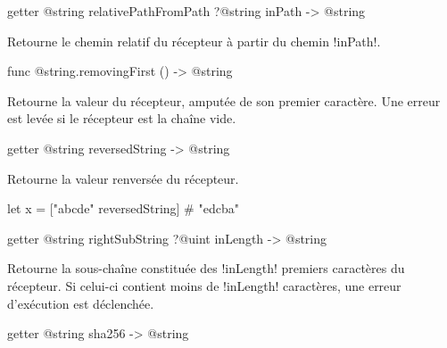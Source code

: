 
\begin{galgas3box}
getter @string relativePathFromPath ?@string inPath -> @string
\end{galgas3box}

Retourne le chemin relatif du récepteur à partir du chemin \ggst!inPath!.










\begin{galgas4box}
func @string.removingFirst () -> @string
\end{galgas4box}

Retourne la valeur du récepteur, amputée de son premier caractère. Une erreur est levée si le récepteur est la chaîne vide.










\begin{galgas3box}
getter @string reversedString -> @string
\end{galgas3box}

Retourne la valeur renversée du récepteur.

\begin{galgas3}
let x = ["abcde" reversedString] # "edcba"
\end{galgas3}









\begin{galgas3box}
getter @string rightSubString ?@uint inLength -> @string
\end{galgas3box}

Retourne la sous-chaîne constituée des \ggst!inLength! premiers caractères du récepteur. Si celui-ci contient moins de \ggst!inLength! caractères, une erreur d'exécution est déclenchée.




\begin{galgas3box}
getter @string sha256 -> @string
\end{galgas3box}


